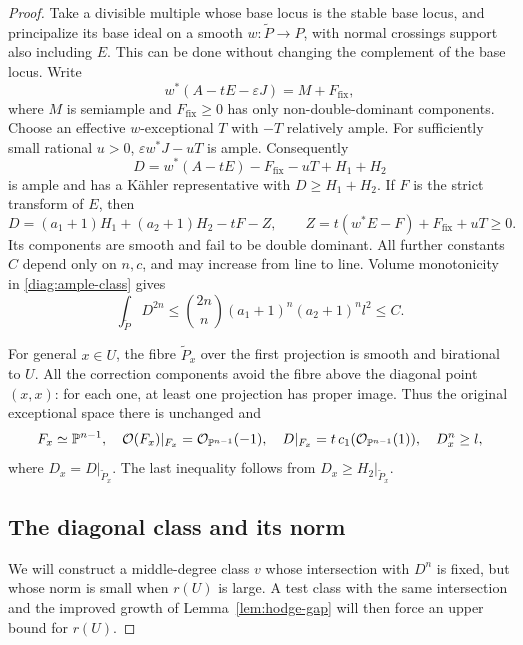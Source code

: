 \begin{proof}
Take a divisible multiple whose base locus is the stable base locus,
and principalize its base ideal on a smooth $w:\widetilde P\to P$,
with normal crossings support also including $E$.  This can be done
without changing the complement of the base locus.  Write
\[
 w^*(A-tE-\varepsilon J)=M+F_{\mathrm{fix}},
\]
where $M$ is semiample and $F_{\mathrm{fix}}\ge0$ has only
non-double-dominant components.  Choose an effective $w$-exceptional
$T$ with $-T$ relatively ample.  For sufficiently small rational
$u>0$, $\varepsilon w^*J-uT$ is ample.  Consequently
\[
 D=w^*(A-tE)-F_{\mathrm{fix}}-uT+H_1+H_2
\]
is ample and has a K\"ahler representative with $D\ge H_1+H_2$.
If $F$ is the strict transform of $E$, then
\begin{equation}\label{diag:ample-class}
 D=(a_1+1)H_1+(a_2+1)H_2-tF-Z,
 \qquad
 Z=t(w^*E-F)+F_{\mathrm{fix}}+uT\ge0.
\end{equation}
Its components are smooth and fail to be double dominant.  All further
constants $C$ depend only on $n,c$, and may increase from line to line.
Volume monotonicity in \eqref{diag:ample-class} gives
\begin{equation}\label{diag:volume}
 \int_{\widetilde P}D^{2n}
 \le\binom{2n}{n}(a_1+1)^n(a_2+1)^n l^2\le C.
\end{equation}

For general $x\in U$, the fibre $\widetilde P_x$ over the first
projection is smooth and birational to $U$.  All the correction
components avoid the fibre above the diagonal point $(x,x)$: for each
one, at least one projection has proper image.  Thus the original
exceptional space there is unchanged and
\begin{equation}\label{diag:fibre-intersections}
 F_x\simeq\mathbb P^{n-1},\quad
 \mathcal O(F_x)|_{F_x}=\mathcal O_{\mathbb P^{n-1}}(-1),\quad
 D|_{F_x}=t\,c_1(\mathcal O_{\mathbb P^{n-1}}(1)),\quad
 D_x^n\ge l,
\end{equation}
where $D_x=D|_{\widetilde P_x}$.  The last inequality follows from
$D_x\ge H_2|_{\widetilde P_x}$.

\subsection*{The diagonal class and its norm}

We will construct a middle-degree class $v$ whose intersection with $D^n$
is fixed, but whose norm is small when $r(U)$ is large.  A test class with
the same intersection and the improved growth of
Lemma~\ref{lem:hodge-gap} will then force an upper bound for $r(U)$.


\end{proof}
